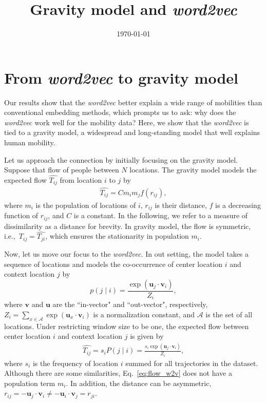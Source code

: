 \documentclass[12pt]{article} %
\def\given{\mid}
\def\ie{i.e.,~}
\begin{document}

\title{Gravity model and \textit{\textit{word2vec}}} %
\date{\today}
\maketitle %

\section{From \textit{word2vec} to gravity model}

Our results show that the \textit{word2vec} better explain a wide range of mobilities than conventional embedding methods, which prompts us to ask: why does the \textit{word2vec} work well for the mobility data?
Here, we show that the \textit{word2vec} is tied to a gravity model, a widespread and long-standing model that well explains human mobility.

Let us approach the connection by initially focusing on the gravity model.
Suppose that flow of people between $N$ locations. The gravity model models the expected flow $\hat{T_{ij}}$ from location $i$ to $j$ by
\begin{align}
    \hat{T_{ij}} = C m_i m_j f(r_{ij}), \label{eq:gravity_model}
\end{align}
where $m_i$ is the population of locations of $i$, $r_{ij}$ is their distance, $f$ is a decreasing function of $r_{ij}$, and $C$ is a constant.
In the following, we refer to a measure of dissimilarity as a distance for brevity.
In gravity model, the flow is symmetric, \ie $\hat{T_{ij}}=\hat{T_{ji}}$, which ensures the stationarity in population $m_{i}$.


Now, let us move our focus to the \textit{word2vec}.
In out setting, the model takes a sequence of locations and models the co-occurrence of center location $i$ and context location $j$ by
\begin{equation}
    p(j \given i) = \frac{\exp(\bm{u}_j \cdot \bm{v}_{i})}{Z_i},
\end{equation}
where $\bm{v}$ and $\bm{u}$ are the ``in-vector" and ``out-vector", respectively,  $Z_i=\sum_{x \in \mathcal{A}} \exp(\bm{u}_{x} \cdot \bm{v}_{i})$ is a normalization constant, and $\mathcal{A}$ is the set of all locations.
Under restricting window size to be one, the expected flow between center location $i$ and context location $j$ is given by
\begin{align}
    \label{eq:flow_w2v}
    \hat{T_{ij}}=s_i P(j\given i) = \frac{s_i\exp(\bm{u}_j \cdot \bm{v}_{i})}{Z_i},
\end{align}
where $s_i$ is the frequency of location $i$ summed for all trajectories in the dataset.
Although there are some similarities, Eq.~\ref{eq:flow_w2v} does not have a population term $m_i$. In addition, the distance can be asymmetric, $r_{ij}=- \bm{u}_{j} \cdot \bm{v}_{i} \neq - \bm{u}_{i} \cdot \bm{v}_{j}=r_{ji}$.
\end{document}
